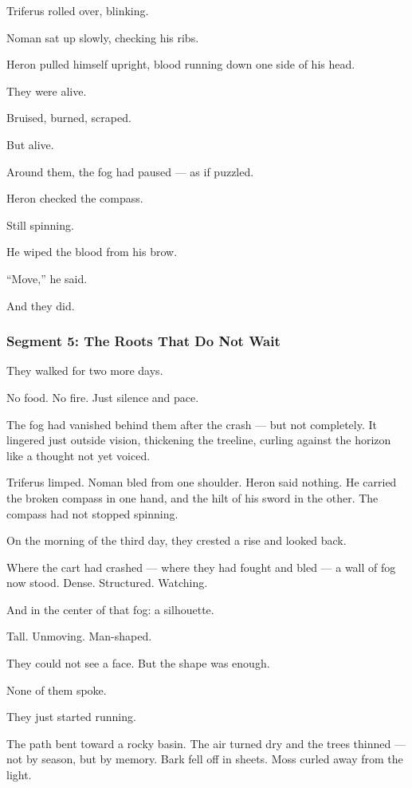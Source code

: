 \documentclass[9pt]{article}
\begin{document}
\bigskip

Triferus rolled over, blinking.

Noman sat up slowly, checking his ribs.

Heron pulled himself upright, blood running down one side of his head.

They were alive.

Bruised, burned, scraped.

But alive.

Around them, the fog had paused — as if puzzled.

Heron checked the compass.

Still spinning.

He wiped the blood from his brow.

“Move,” he said.

And they did.

\newpage

\subsubsection*{Segment 5: The Roots That Do Not Wait}

They walked for two more days.

No food. No fire. Just silence and pace.

The fog had vanished behind them after the crash — but not completely. It lingered just outside vision, thickening the treeline, curling against the horizon like a thought not yet voiced.

Triferus limped. Noman bled from one shoulder. Heron said nothing. He carried the broken compass in one hand, and the hilt of his sword in the other. The compass had not stopped spinning.

\bigskip

On the morning of the third day, they crested a rise and looked back.

Where the cart had crashed — where they had fought and bled — a wall of fog now stood. Dense. Structured. Watching.

And in the center of that fog: a silhouette.

Tall. Unmoving. Man-shaped.

They could not see a face. But the shape was enough.

None of them spoke.

They just started running.

\bigskip

The path bent toward a rocky basin. The air turned dry and the trees thinned — not by season, but by memory. Bark fell off in sheets. Moss curled away from the light.
\end{document}
